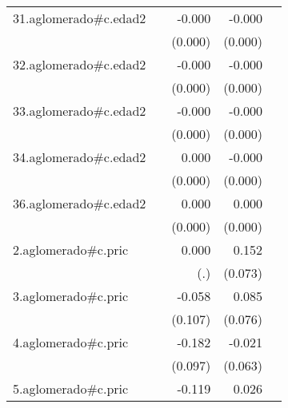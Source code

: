 {\begin{longtable}{l*{4}{D{.}{.}{-1}}}
\addlinespace
31.aglomerado#c.edad2&                     &      -0.000         &      -0.000         &                     \\
            &                     &     (0.000)         &     (0.000)         &                     \\
\addlinespace
32.aglomerado#c.edad2&                     &      -0.000         &      -0.000\sym{**} &                     \\
            &                     &     (0.000)         &     (0.000)         &                     \\
\addlinespace
33.aglomerado#c.edad2&                     &      -0.000         &      -0.000\sym{*}  &                     \\
            &                     &     (0.000)         &     (0.000)         &                     \\
\addlinespace
34.aglomerado#c.edad2&                     &       0.000         &      -0.000         &                     \\
            &                     &     (0.000)         &     (0.000)         &                     \\
\addlinespace
36.aglomerado#c.edad2&                     &       0.000         &       0.000         &                     \\
            &                     &     (0.000)         &     (0.000)         &                     \\
\addlinespace
2.aglomerado#c.pric&                     &       0.000         &       0.152\sym{*}  &                     \\
            &                     &         (.)         &     (0.073)         &                     \\
\addlinespace
3.aglomerado#c.pric&                     &      -0.058         &       0.085         &                     \\
            &                     &     (0.107)         &     (0.076)         &                     \\
\addlinespace
4.aglomerado#c.pric&                     &      -0.182         &      -0.021         &                     \\
            &                     &     (0.097)         &     (0.063)         &                     \\
\addlinespace
5.aglomerado#c.pric&                     &      -0.119         &       0.026         &                     \\

\end{longtable}}

